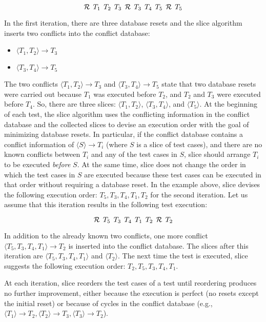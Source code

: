 \documentclass[authoryear,preprint,12pt]{elsarticle}
\begin{document}
$$
{\cal R} \:\: T_1 \:\: T_2 \:\: T_3 \:\: {\cal R} \:\: T_3 \:\: T_4 \:\: T_5 \:\: {\cal R} \:\: T_5
$$

In the first iteration, there are three database resets 
and the {\sc slice} algorithm inserts two conflicts into the conflict database:

\begin{itemize}
\item $\langle T_1, T_2 \rangle \rightarrow T_3$
\item $\langle T_3, T_4 \rangle \rightarrow T_5$ 
\end{itemize}

The two conflicts $\langle T_1, T_2 \rangle \rightarrow T_3$ and $\langle T_3, T_4 \rangle \rightarrow T_5$
state that two database resets were carried out 
because $T_1$ was executed before $T_2$, and 
$T_2$ and $T_3$ were executed before $T_4$.
So, there are three slices: $\langle T_1, T_2 \rangle$, $\langle T_3, T_4 \rangle$, and $\langle T_5 \rangle$.
At the beginning of each test,
the {\sc slice} algorithm 
uses the conflicting information in the conflict database and the collected slices
to devise an execution order with the goal of minimizing database resets.
In particular, if the conflict database contains a conflict information of $\langle S \rangle \rightarrow T_i$ (where $S$ is a slice of test cases), 
and there are no known conflicts between $T_i$ and any of the test cases in $S$,
{\sc slice} should arrange $T_i$ to be executed \emph{before} $S$.
At the same time, {\sc slice} does not change the order in which the test cases in $S$ are executed
because these test cases can be executed in that order without requiring a database reset.
In the example above, {\sc slice} devises the following execution order:
$T_5, T_3, T_4, T_1, T_2$  for the second iteration.
Let us assume that this iteration results in the following test execution:


$$
{\cal R} \:\: T_5 \:\: T_3  \:\: T_4 \:\: T_1 \:\: T_2 \:\: {\cal R} \:\: T_2
$$

In addition to the already known two conflicts, 
one more conflict $\langle T_5, T_3, T_4, T_1 \rangle \rightarrow T_2$ is inserted into the conflict database.
The slices after this iteration are $\langle T_5, T_3, T_4, T_1 \rangle$ and $\langle T_2 \rangle$.
The next time the test is executed, {\sc slice} suggests the following execution order: $T_2, T_5, T_3, T_4, T_1$.

At each iteration, {\sc slice} reorders the test cases of a test until reordering produces no further improvement, either because 
the execution is perfect (no resets except the initial reset) or because of cycles in the conflict database 
(e.g., $\langle T_1 \rangle \rightarrow T_2, \langle T_2 \rangle \rightarrow T_3, \langle T_3 \rangle \rightarrow T_2$).
      
\end{document}
